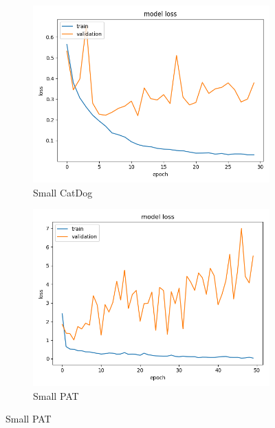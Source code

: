 \begin{figure}
\centering
\begin{subfigure}[b]{.45\linewidth}
\includegraphics[width=\linewidth]{Figs/small_catdog_loss.jpg}
\caption{Small CatDog}
\end{subfigure}
\begin{subfigure}[b]{.45\linewidth}
\includegraphics[width=\linewidth]{Figs/small_pat_loss.jpg}
\caption{Small PAT}
\end{subfigure}


\end{figure}
